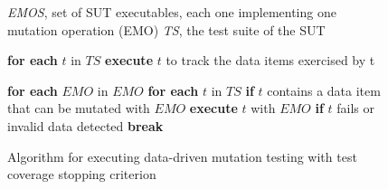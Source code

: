 

\begin{figure}[tb]

\begin{algorithmic}[1]

\scriptsize
\Require \emph{EMOS}, set of SUT executables, each one implementing one mutation operation (EMO)
\Require \emph{TS}, the test suite of the SUT


\State \hspace{5 mm} \textbf{for each} $t$ in $TS$ \label{alg:prioritize:prel}
\State \hspace{10 mm} \textbf{execute} $t$ to track the data items exercised by t

\State \textbf{for each} $EMO$ in $EMO$ \label{alg:dataProcess:repeat}
\State \hspace{5 mm} \textbf{for each} $t$ in $TS$ \label{alg:prioritize:t}
\State \hspace{10 mm} \textbf{if} $t$ contains a data item that can be mutated with $EMO$ \label{alg:prioritize:cove}
\State \hspace{15 mm} \textbf{execute} $t$ with $EMO$
\State \hspace{15 mm} \textbf{if} $t$ fails or invalid data detected
\State \hspace{\INDB mm} \textbf{break} \label{alg:prioritize:stop}



\end{algorithmic}
\vspace{-3mm}
\caption{Algorithm for executing data-driven mutation testing with test coverage stopping criterion}
\label{alg:dataProcess}
\end{figure}


